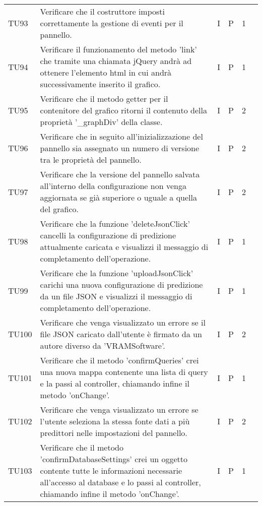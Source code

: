 \begin{longtable} {
		>{}p{12mm}
		>{}p{79.5mm}
		>{}p{9mm}
		>{}p{8mm}
		>{}p{14mm}
		>{}p{0mm}}
	TU93		& Verificare che il costruttore imposti correttamente la gestione di eventi per il pannello. & I & P & 1 & \TBstrut \\ [2mm]
	TU94		& Verificare il funzionamento del metodo 'link' che tramite una chiamata jQuery andrà ad ottenere l'elemento html in cui andrà successivamente inserito il grafico. & I & P & 1 & \TBstrut \\ [2mm]
	TU95		& Verificare che il metodo getter per il contenitore del grafico ritorni il contenuto della proprietà '\_graphDiv' della classe. & I & P & 2 & \TBstrut \\ [2mm]
	TU96		& Verificare che in seguito all'inizializzazione del pannello sia assegnato un numero di versione tra le proprietà del pannello. & I & P & 2 & \TBstrut \\ [2mm]
	TU97		& Verificare che la versione del pannello salvata all'interno della configurazione non venga aggiornata se già superiore o uguale a quella del grafico. & I & P & 2 & \TBstrut \\ [2mm]
	TU98		& Verificare che la funzione 'deleteJsonClick' cancelli la configurazione di predizione attualmente caricata e visualizzi il messaggio di completamento dell'operazione. & I & P & 1 & \TBstrut \\ [2mm]
	TU99		& Verificare che la funzione 'uploadJsonClick' carichi una nuova configurazione di predizione da un file JSON e visualizzi il messaggio di completamento dell'operazione. & I & P & 1 & \TBstrut \\ [2mm]
	TU100		& Verificare che venga visualizzato un errore se il file JSON caricato dall'utente è firmato da un autore diverso da 'VRAMSoftware'. & I & P & 2 & \TBstrut \\ [2mm]
	TU101		& Verificare che il metodo 'confirmQueries' crei una nuova mappa contenente una lista di query e la passi al controller, chiamando infine il metodo 'onChange'. & I & P & 1 & \TBstrut \\ [2mm]
	TU102		& Verificare che venga visualizzato un errore se l'utente seleziona la stessa fonte dati a più predittori nelle impostazioni del pannello. & I & P & 2 & \TBstrut \\ [2mm]
	TU103		& Verificare che il metodo 'confirmDatabaseSettings' crei un oggetto contente tutte le informazioni necessarie all'accesso al database e lo passi al controller, chiamando infine il metodo 'onChange'. & I & P & 1 & \TBstrut \\ [2mm]

\end{longtable}
